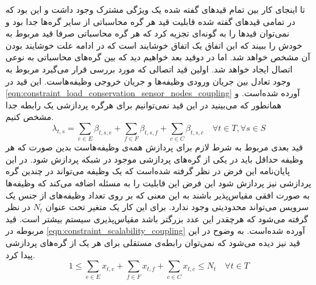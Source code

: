 	تا اینجای کار بین تمام قیدهای گفته شده یک ویژگی مشترک وجود داشت و این بود که در تمامی قیدهای گفته شده قابلیت قید هر گره محاسباتی از سایر گره‌ها جدا بود و نمی‌توان قیدها را به گونه‌ای تجزیه کرد که هر گره محاسباتی صرفا قید مربوط به خودش را ببیند که این اتفاق یک اتفاق خوشایند است که در ادامه علت خوشایند بودن آن مشخص خواهد شد. اما در دوقید بعد خواهیم دید که بین گره‌های محاسباتی به نوعی اتصال ایجاد خواهد شد. 
	اولین قید اتصالی که مورد بررسی قرار می‌گیرد مربوط به وجود تعادل بین جریان ورودی وظیفه‌ها و جریان خروجی وظیفه‌هاست. این قید در \cref{eqn:constraint_load_conservation_sensor_nodes_coupling} آورده شده‌است. و همانطور که می‌بینید در این قید نمی‌توانیم برای هرگره پردازشی یک رابطه جدا مشخص کنیم. 
	\begin{equation}\label{eqn:constraint_load_conservation_sensor_nodes_coupling}
	\lambda_{t,s} = \sum_{e \in E} \beta_{t,s,e} + \sum_{f 	\in F} \beta_{t,s,f}
	+\sum_{c \in C}\beta_{t,s,c} \quad \forall{t \in T}, \forall{s \in S}
	\end{equation} 
	قید بعدی مربوط به شرط لازم برای پردازش همه‌ی وظیفه‌هاست بدین صورت که هر وظیفه حداقل باید در یکی از گره‌های پردازشی موجود در شبکه پردازش شود. در این پایان‌نامه این فرض در نظر گرفته شده‌است که یک وظیفه می‌تواند در چندین گره پردازشی نیز پردازش شود این فرض این قابلیت را به مسئله اضافه می‌کند که وظیفه‌ها به صورت افقی مقیاس‌پذیر باشند به این معنی که بر روی تعداد وظیفه‌های از جنس یک سرویس می‌تواند محدودیتی وجود ندارد. برای این کار یک متغیر تحت عنوان $N_t$ در نظر گرفته می‌شود که هرچقدر این عدد بزرگتر باشد مقیاس‌پذیری سیستم بیشتر است. قید مربوطه در \cref{eqn:constraint_scalability_coupling} آورده شده‌است. به وضوح در این قید نیز دیده می‌شود که نمی‌توان رابطه‌ی مستقلی برای هر یک از گره‌های پردازشی پیدا کرد. 
	\begin{equation}\label{eqn:constraint_scalability_coupling}
		1 \le \sum_{e \in E}x_{t,e} + \sum_{f \in F}x_{t,f} + \sum_{c \in C}x_{t,c} \le N_t \quad \forall{t \in T}
	\end{equation}
